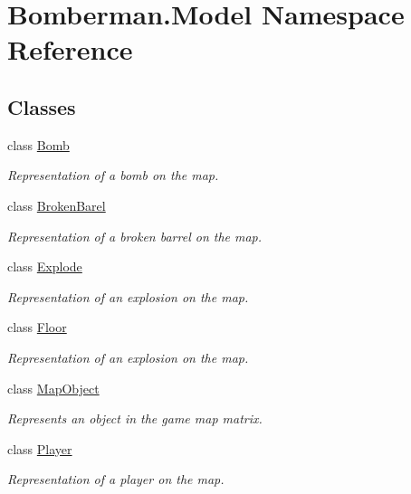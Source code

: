 \hypertarget{namespace_bomberman_1_1_model}{}\section{Bomberman.\+Model Namespace Reference}
\label{namespace_bomberman_1_1_model}
\subsection*{Classes}
\begin{DoxyCompactItemize}
\item 
class \mbox{\hyperlink{class_bomberman_1_1_model_1_1_bomb}{Bomb}}
\begin{DoxyCompactList}\small\item\em Representation of a bomb on the map. \end{DoxyCompactList}\item 
class \mbox{\hyperlink{class_bomberman_1_1_model_1_1_broken_barel}{Broken\+Barel}}
\begin{DoxyCompactList}\small\item\em Representation of a broken barrel on the map. \end{DoxyCompactList}\item 
class \mbox{\hyperlink{class_bomberman_1_1_model_1_1_explode}{Explode}}
\begin{DoxyCompactList}\small\item\em Representation of an explosion on the map. \end{DoxyCompactList}\item 
class \mbox{\hyperlink{class_bomberman_1_1_model_1_1_floor}{Floor}}
\begin{DoxyCompactList}\small\item\em Representation of an explosion on the map. \end{DoxyCompactList}\item 
class \mbox{\hyperlink{class_bomberman_1_1_model_1_1_map_object}{Map\+Object}}
\begin{DoxyCompactList}\small\item\em Represents an object in the game map matrix. \end{DoxyCompactList}\item 
class \mbox{\hyperlink{class_bomberman_1_1_model_1_1_player}{Player}}
\begin{DoxyCompactList}\small\item\em Representation of a player on the map. \end{DoxyCompactList}\item 

\end{DoxyCompactItemize}
